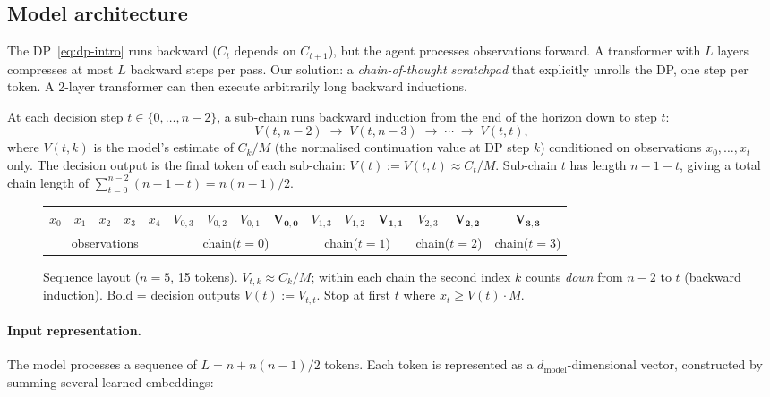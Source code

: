 \subsection{Model architecture}

The DP~\eqref{eq:dp-intro} runs backward ($C_t$ depends on $C_{t+1}$), but the agent processes observations forward. A transformer with $L$ layers compresses at most $L$ backward steps per pass. Our solution: a \emph{chain-of-thought scratchpad} that explicitly unrolls the DP, one step per token. A 2-layer transformer can then execute arbitrarily long backward inductions.

At each decision step $t \in \{0, \ldots, n{-}2\}$, a sub-chain runs backward induction from the end of the horizon down to step $t$:
\[
  V(t, n{-}2) \;\to\; V(t, n{-}3) \;\to\; \cdots \;\to\; V(t, t),
\]
where $V(t,k)$ is the model's estimate of $C_k/M$ (the normalised continuation value at DP step $k$) conditioned on observations $x_0, \ldots, x_t$ only. The decision output is the final token of each sub-chain: $V(t) := V(t,t) \approx C_t/M$. Sub-chain $t$ has length $n{-}1{-}t$, giving a total chain length of $\sum_{t=0}^{n-2}(n{-}1{-}t) = n(n{-}1)/2$.

\begin{figure}[h]
\centering
\footnotesize
\setlength{\tabcolsep}{2.5pt}
\begin{tabular}{|c|c|c|c|c||c|c|c|c||c|c|c||c|c||c|}
\hline
$x_0$ & $x_1$ & $x_2$ & $x_3$ & $x_4$ &
$V_{0,3}$ & $V_{0,2}$ & $V_{0,1}$ & $\mathbf{V_{0,0}}$ &
$V_{1,3}$ & $V_{1,2}$ & $\mathbf{V_{1,1}}$ &
$V_{2,3}$ & $\mathbf{V_{2,2}}$ &
$\mathbf{V_{3,3}}$ \\
\hline
\multicolumn{5}{|c||}{observations} & \multicolumn{4}{c||}{chain($t{=}0$)} & \multicolumn{3}{c||}{chain($t{=}1$)} & \multicolumn{2}{c||}{chain($t{=}2$)} & chain($t{=}3$) \\
\hline
\end{tabular}
\caption{Sequence layout ($n = 5$, 15 tokens). $V_{t,k} \approx C_k/M$; within each chain the second index $k$ counts \emph{down} from $n{-}2$ to $t$ (backward induction). Bold = decision outputs $V(t) := V_{t,t}$. Stop at first $t$ where $x_t \ge V(t) \cdot M$.}
\label{fig:layout}
\end{figure}

\paragraph{Input representation.}
The model processes a sequence of $L = n + n(n{-}1)/2$ tokens. Each token is represented as a $d_{\mathrm{model}}$-dimensional vector, constructed by summing several learned embeddings:

